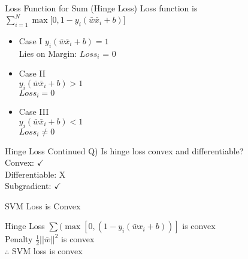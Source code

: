 \documentclass{beamer}
\begin{document}
	\begin{frame}{Loss Function for Sum (Hinge Loss)}
		Loss function is $\sum_{i=1}^{N}\max\big[0, 1 - y_{i}(\bar{w}\bar{x}_{i} + b)\big]$ \\
		\begin{itemize}[<+->]
			\item Case I 
			\hspace{0.5cm} $y_{i}(\bar{w}\bar{x}_{i} + b) = 1$ \\
			
			Lies on Margin: $Loss_{i}$ = 0 \\
		
			\item Case II \\
			\hspace{0.5cm} $y_{i}(\bar{w}\bar{x}_{i} + b) > 1$ \\
			$Loss_{i} = 0$ \\ 
			
			\item 	Case III \\
			\hspace{0.5cm} $y_{i}(\bar{w}\bar{x}_{i} + b) < 1$ \\
			$Loss_{i} \neq 0$
		\end{itemize}
		
		
	
	\end{frame}
	\begin{frame}{Hinge Loss Continued}
		Q) Is hinge loss convex and differentiable? \\
		\hspace{0.5cm}Convex: $\checkmark$ \\
		\hspace{0.5cm}Differentiable: X\\
		\hspace{0.5cm}Subgradient: $\checkmark$
	\end{frame}
	\begin{frame}{SVM Loss is Convex}
		
		Hinge Loss $\sum(\max[0, (1-y_{i}(\bar{w}x_{i}+b))]$ is convex \\
		\vspace{1cm}
		Penalty $\frac{1}{2}\lvert\lvert\bar{w}\rvert\rvert^{2}$ is convex \\
		\vspace{1cm}
		$\therefore$ SVM loss is convex
	\end{frame}
	
\end{document}
